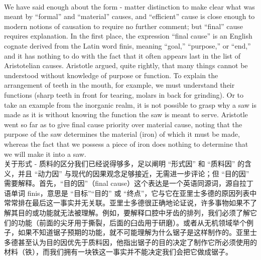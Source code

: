 \documentclass{article}
\begin{document}
\\
We have said enough about the form - matter distinction to make clear what was meant by “formal” and “material” causes, and “efficient” cause is close enough to modern notions of causation to require no further comment; but “final” cause requires explanation. In the first place, the expression “final cause” is an English cognate derived from the Latin word finis, meaning “goal,” “purpose,” or “end,” and it has nothing to do with the fact that it often appears last in the list of Aristotelian causes. Aristotle argued, quite rightly, that many things cannot be understood without knowledge of purpose or function. To explain the arrangement of teeth in the mouth, for example, we must understand their functions (sharp teeth in front for tearing, molars in back for grinding). Or to take an example from the inorganic realm, it is not possible to grasp why a saw is made as it is without knowing the function the saw is meant to serve. Aristotle went so far as to give final cause priority over material cause, noting that the purpose of the saw determines the material (iron) of which it must be made, whereas the fact that we possess a piece of iron does nothing to determine that we will make it into a saw.\\
关于形式 - 质料的区分我们已经说得够多，足以阐明 “形式因” 和 “质料因” 的含义，并且 “动力因” 与现代的因果观念足够接近，无需进一步评论；但 “目的因” 需要解释。首先，“目的因”（final cause）这个表达是一个英语同源词，源自拉丁语单词 finis，意思是 “目标”“目的” 或 “终点”，它与它在亚里士多德的原因列表中常常排在最后这一事实并无关联。亚里士多德很正确地论证说，许多事物如果不了解其目的或功能就无法被理解。例如，要解释口腔中牙齿的排列，我们必须了解它们的功能（前面的尖牙用于撕裂，后面的臼齿用于研磨）。或者从无机领域举个例子，如果不知道锯子预期的功能，就不可能理解为什么锯子是这样制作的。亚里士多德甚至认为目的因优先于质料因，他指出锯子的目的决定了制作它所必须使用的材料（铁），而我们拥有一块铁这一事实并不能决定我们会把它做成锯子。\\
\end{document}
